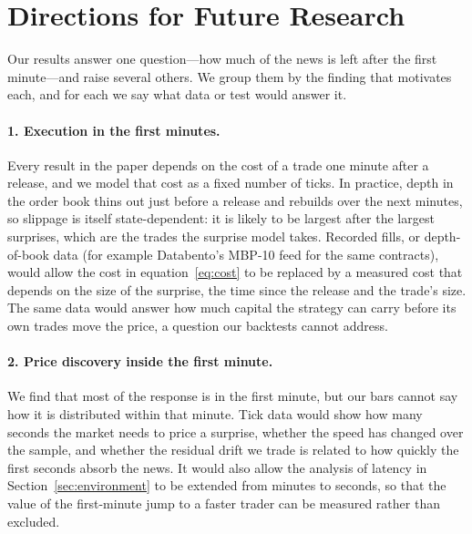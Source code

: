 \section{Directions for Future Research}\label{sec:future}

Our results answer one question---how much of the news is left after the first minute---and
raise several others. We group them by the finding that motivates each, and for each we say what
data or test would answer it.

\paragraph{1. Execution in the first minutes.} Every result in the paper depends on the cost
of a trade one minute after a release, and we model that cost as a fixed number of ticks. In
practice, depth in the order book thins out just before a release and rebuilds over the next
minutes, so slippage is itself state-dependent: it is likely to be largest after the largest
surprises, which are the trades the surprise model takes. Recorded fills, or depth-of-book data
(for example Databento's MBP-10 feed for the same contracts), would allow the cost in
equation~\eqref{eq:cost} to be replaced by a measured cost that depends on the size of the surprise,
the time since the release and the trade's size. The same data would answer how much capital the
strategy can carry before its own trades move the price, a question our backtests cannot address.

\paragraph{2. Price discovery inside the first minute.} We find that most of the response is in
the first minute, but our bars cannot say how it is distributed within that minute. Tick data
would show how many seconds the market needs to price a surprise, whether the speed has changed
over the sample, and whether the residual drift we trade is related to how quickly the first
seconds absorb the news. It would also allow the analysis of latency in
Section~\ref{sec:environment} to be extended from minutes to seconds, so that the value of the
first-minute jump to a faster trader can be measured rather than excluded.

